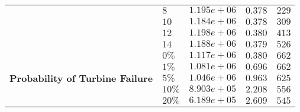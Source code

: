 \begin{tabular}{l|llll}
&                                                        $8$                      & $1.195e+06$ & $0.378$ & $229$ \\ 
&                                                        $10$                     & $1.184e+06$ & $0.378$ & $309$ \\ 
&                                                        $12$                     & $1.198e+06$ & $0.380$ & $413$ \\ 
&                                                        $14$                     & $1.188e+06$ & $0.379$ & $526$ \\ \hline 
\multirow{5}{*}{\textbf{Probability of Turbine Failure}} & $0\%$          & $1.117e+06$ & $0.380$ & $662$ \\ 
&                                                                  $1\%$          & $1.081e+06$ & $0.696$ & $662$ \\ 
&                                                                  $5\%$          & $1.046e+06$ & $0.963$ & $625$ \\ 
&                                                                  $10\%$         & $8.903e+05$ & $2.208$ & $556$ \\ 
&                                                                  $20\%$         & $6.189e+05$ & $2.609$ & $545$ 
\end{tabular}